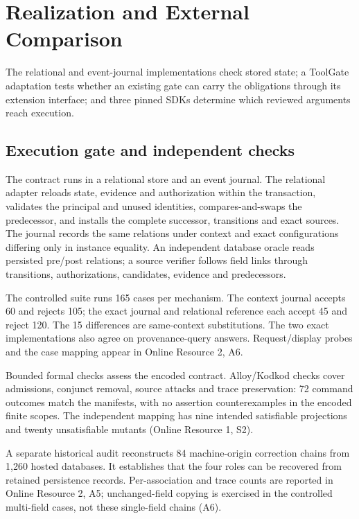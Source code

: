 \documentclass[pdflatex,sn-basic]{sn-jnl}
\begin{document}
\section{Realization and External Comparison}\label{realization-and-external-comparison}

The relational and event-journal implementations check stored state; a ToolGate adaptation tests whether an existing gate can carry the obligations through its extension interface; and three pinned SDKs determine which reviewed arguments reach execution.

\subsection{Execution gate and independent checks}\label{execution-gate-and-independent-checks}

The contract runs in a relational store and an event journal. The relational adapter reloads state, evidence and authorization within the transaction, validates the principal and unused identities, compares-and-swaps the predecessor, and installs the complete successor, transitions and exact sources. The journal records the same relations under context and exact configurations differing only in instance equality. An independent database oracle reads persisted pre/post relations; a source verifier follows field links through transitions, authorizations, candidates, evidence and predecessors.

The controlled suite runs 165 cases per mechanism. The context journal accepts 60 and rejects 105; the exact journal and relational reference each accept 45 and reject 120. The 15 differences are same-context substitutions. The two exact implementations also agree on provenance-query answers. Request/display probes and the case mapping appear in Online Resource 2, A6.

Bounded formal checks assess the encoded contract. Alloy/Kodkod checks \citep{alloy,kodkod} cover admissions, conjunct removal, source attacks and trace preservation: 72 command outcomes match the manifests, with no assertion counterexamples in the encoded finite scopes. The independent mapping has nine intended satisfiable projections and twenty unsatisfiable mutants (Online Resource 1, S2).

A separate historical audit reconstructs 84 machine-origin correction chains from 1,260 hosted databases. It establishes that the four roles can be recovered from retained persistence records. Per-association and trace counts are reported in Online Resource 2, A5; unchanged-field copying is exercised in the controlled multi-field cases, not these single-field chains (A6).
\end{document}
